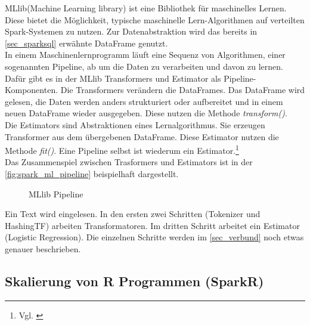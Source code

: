 MLlib(Machine Learning library) ist eine Bibliothek für maschinelles Lernen. Diese bietet die Möglichkeit, typische maschinelle Lern-Algorithmen auf verteilten Spark-Systemen zu nutzen. Zur Datenabstraktion wird das bereits in \ref{sec_sparksql} erwähnte DataFrame genutzt.  \\

\noindent
In einem Maschinenlernprogramm läuft eine Sequenz von Algorithmen, einer sogenannten Pipeline, ab um die Daten zu verarbeiten und davon zu lernen. 
Dafür gibt es in der MLlib Transformers und Estimator als Pipeline-Komponenten.
Die Transformers verändern die DataFrames. Das DataFrame wird gelesen, die Daten werden anders strukturiert oder aufbereitet und in einem neuen DataFrame wieder ausgegeben. Diese nutzen die Methode \textsl{transform()}.\\
Die Estimators sind Abstraktionen eines Lernalgorithmus. Sie erzeugen Transformer aus dem übergebenen DataFrame. Diese Estimator nutzen die Methode \textsl{fit()}.
Eine Pipeline selbst ist wiederum ein Estimator.\footnote{Vgl. \cite{AAWS15}} \\

\noindent
Das Zusammenspiel zwischen Trasformers und Estimators ist in der \autoref{fig:spark_ml_pipeline} beispielhaft dargestellt. \\
 
\begin{figure}[h]
  \centering
  \caption{MLlib Pipeline \cite{SPMLLIB}}\label{fig:spark_ml_pipeline}
\end{figure}

\noindent
Ein Text wird eingelesen. In den ersten zwei Schritten (Tokenizer und HashingTF) arbeiten Transformatoren. Im dritten Schritt arbeitet ein Estimator (Logistic Regression). Die einzelnen Schritte werden im \autoref{sec_verbund} noch etwas genauer beschrieben.





\newpage
\subsection{Skalierung von R Programmen (SparkR)}\label{sec_sparkr}

